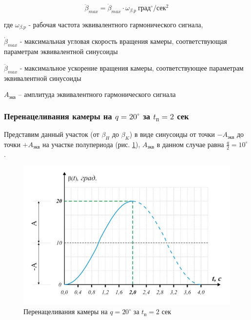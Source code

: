\begin{equation}
    \label{max_acceleration_for_equiv_signal}
    \ddot{\beta}_{max} = \dot{\beta}_{max} \cdot \omega_{\beta.p} ~\text{град}^{\circ} / \text{сек}^{2}
\end{equation}

где $\omega_{\beta.p}$ - рабочая частота эквивалентного гармонического сигнала,

$\dot{\beta}_{max}$ - максимальная угловая скорость вращения камеры, соответствующая параметрам эквивалентной синусоиды

$\ddot{\beta}_{max}$ - максимальное ускорение вращения камеры, соответствующее параметрам эквивалентной синусоиды

$A_\text{экв}$ – амплитуда эквивалентного гармонического сигнала

\subsubsection{Перенацеливания камеры на $q = 20^{\circ}$ за $t_\text{п} = 2$ сек}

Представим данный участок (от $\beta_{H}$ до $\beta_{K}$) в виде синусоиды от точки $-A_\text{экв}$ до точки $+A_\text{экв}$ на участке полупериода (рис. \ref{retarget_20grad_2sec}), $A_\text{экв}$ в данном случае равна $\frac{q}{2} = 10^{\circ}$.

\begin{figure}[h!]
    \centering
    \includegraphics[keepaspectratio]{./src/pictures/retarget_equivalent_input_signals/20grad_2sec}
    \caption{Перенацеливания камеры на $q = 20^{\circ}$ за $t_\text{п} = 2$ сек}
    \label{retarget_20grad_2sec}
\end{figure}

